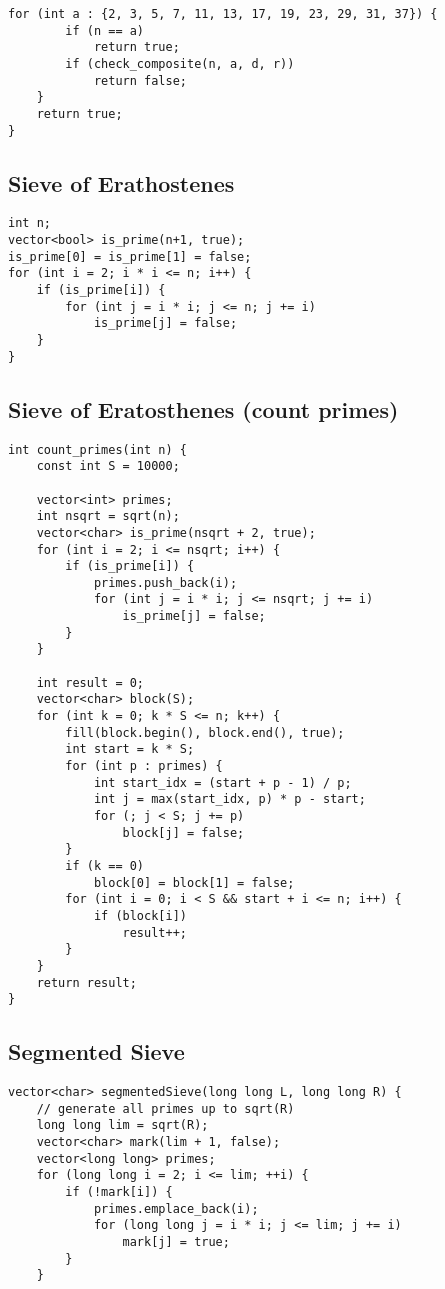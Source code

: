 \documentclass[10pt]{article}
\begin{document}
\begin{multicols*}{2}
\begin{lstlisting}[style=compactcpp]
    for (int a : {2, 3, 5, 7, 11, 13, 17, 19, 23, 29, 31, 37}) {
        if (n == a)
            return true;
        if (check_composite(n, a, d, r))
            return false;
    }
    return true;
}
\end{lstlisting}

\subsection{Sieve of Erathostenes}

\begin{lstlisting}[style=compactcpp]
int n;
vector<bool> is_prime(n+1, true);
is_prime[0] = is_prime[1] = false;
for (int i = 2; i * i <= n; i++) {
    if (is_prime[i]) {
        for (int j = i * i; j <= n; j += i)
            is_prime[j] = false;
    }
}
\end{lstlisting}

\subsection{Sieve of Eratosthenes (count primes)}
\begin{lstlisting}[style=compactcpp]
int count_primes(int n) {
    const int S = 10000;

    vector<int> primes;
    int nsqrt = sqrt(n);
    vector<char> is_prime(nsqrt + 2, true);
    for (int i = 2; i <= nsqrt; i++) {
        if (is_prime[i]) {
            primes.push_back(i);
            for (int j = i * i; j <= nsqrt; j += i)
                is_prime[j] = false;
        }
    }

    int result = 0;
    vector<char> block(S);
    for (int k = 0; k * S <= n; k++) {
        fill(block.begin(), block.end(), true);
        int start = k * S;
        for (int p : primes) {
            int start_idx = (start + p - 1) / p;
            int j = max(start_idx, p) * p - start;
            for (; j < S; j += p)
                block[j] = false;
        }
        if (k == 0)
            block[0] = block[1] = false;
        for (int i = 0; i < S && start + i <= n; i++) {
            if (block[i])
                result++;
        }
    }
    return result;
}

\end{lstlisting}
\subsection{Segmented Sieve}
\begin{lstlisting}[style=compactcpp]
vector<char> segmentedSieve(long long L, long long R) {
    // generate all primes up to sqrt(R)
    long long lim = sqrt(R);
    vector<char> mark(lim + 1, false);
    vector<long long> primes;
    for (long long i = 2; i <= lim; ++i) {
        if (!mark[i]) {
            primes.emplace_back(i);
            for (long long j = i * i; j <= lim; j += i)
                mark[j] = true;
        }
    }


\end{lstlisting}
\end{multicols*}
\end{document}
